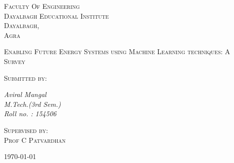 \documentclass[12pt, a4paper]{report}
\begin{document}
\begin{titlepage}
     \centering
     {\scshape\LARGE Faculty Of Engineering \\ Dayalbagh Educational Institute \\Dayalbagh, \\Agra \par}
     \vspace{1cm}
     {\scshape\Large  Enabling Future Energy Systems using Machine Learning techniques: A Survey \\ \par}
     \vspace{1.5cm}
     \vspace{2cm}
     {\scshape\Large Submitted by: \\ \par}
     
     {\Large\itshape Aviral Mangal \\ M.Tech.(3rd Sem.) \\Roll no. : 154506 \par}
     \vfill
     {\scshape\Large Supervised by: \\ 
     Prof C Patvardhan \textsc{} \par}
     \vfill
     {\large \today\par}    
\end{titlepage}
\end{document}
